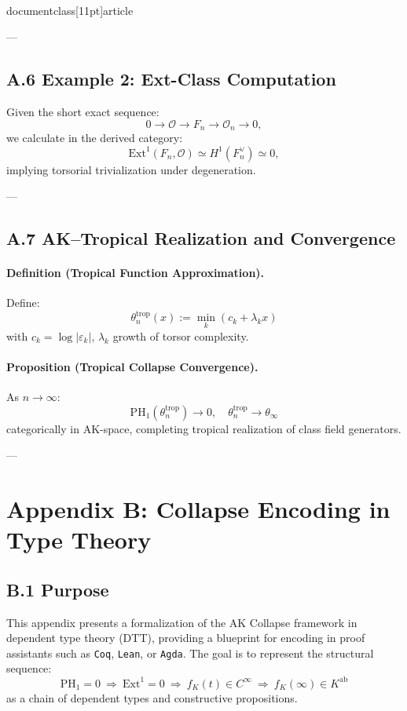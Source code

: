 \\documentclass[11pt]{article}
\begin{document}
---

\subsection*{A.6 Example 2: Ext-Class Computation}

Given the short exact sequence:
\[
0 \to \mathcal{O} \to F_n \to \mathcal{O}_n \to 0,
\]
we calculate in the derived category:
\[
\mathrm{Ext}^1(F_n, \mathcal{O}) \simeq H^1(F_n^\vee) \simeq 0,
\]
implying torsorial trivialization under degeneration.

---

\subsection*{A.7 AK–Tropical Realization and Convergence}

\paragraph{Definition (Tropical Function Approximation).}
Define:
\[
\theta_n^{\mathrm{trop}}(x) := \min_k (c_k + \lambda_k x)
\]
with \( c_k = \log|\varepsilon_k| \), \( \lambda_k \) growth of torsor complexity.

\paragraph{Proposition (Tropical Collapse Convergence).}
As \( n \to \infty \):
\[
\mathrm{PH}_1(\theta_n^{\mathrm{trop}}) \to 0,\quad \theta_n^{\mathrm{trop}} \to \theta_\infty
\]
categorically in AK-space, completing tropical realization of class field generators.


---


\section*{Appendix B: Collapse Encoding in Type Theory}

\subsection*{B.1 Purpose}

This appendix presents a formalization of the AK Collapse framework in dependent type theory (DTT),  
providing a blueprint for encoding in proof assistants such as \texttt{Coq}, \texttt{Lean}, or \texttt{Agda}.  
The goal is to represent the structural sequence:
\[
\mathrm{PH}_1 = 0 \ \Rightarrow\ \mathrm{Ext}^1 = 0 \ \Rightarrow\ f_K(t) \in C^\infty \ \Rightarrow\ f_K(\infty) \in K^{\mathrm{ab}}
\]
as a chain of dependent types and constructive propositions.
\end{document}
